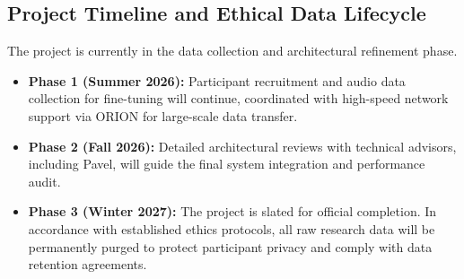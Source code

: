 \documentclass[11pt]{article}
\begin{document}
\subsection{Project Timeline and Ethical Data Lifecycle}
The project is currently in the data collection and architectural refinement phase. 
\begin{itemize}
    \item \textbf{Phase 1 (Summer 2026):} Participant recruitment and audio data collection for fine-tuning will continue, coordinated with high-speed network support via ORION for large-scale data transfer.
    \item \textbf{Phase 2 (Fall 2026):} Detailed architectural reviews with technical advisors, including Pavel, will guide the final system integration and performance audit.
    \item \textbf{Phase 3 (Winter 2027):} The project is slated for official completion. In accordance with established ethics protocols, all raw research data will be permanently purged to protect participant privacy and comply with data retention agreements.
\end{itemize}







\end{document}
